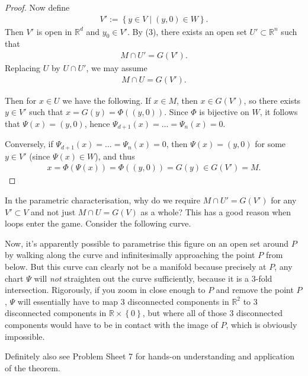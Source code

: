 \begin{proof}
	Now define
	\begin{align*}
		V' := \left\{ y \in V \mid (y,0) \in W \right\}.
	\end{align*}
	Then $V'$ is open in $\mathbb{R}^{d}$ and $y_{0} \in V'$. By (3), there exists an open set $U' \subset \mathbb{R}^{n}$ such that
	\begin{align*}
		M \cap U' = G(V').
	\end{align*}
	Replacing $U$ by $U \cap U'$, we may assume
	\begin{align*}
		M \cap U = G(V').
	\end{align*}

	Then for $x \in U$ we have the following. If $x \in M$, then $x \in G(V')$, so there exists $y \in V'$ such that $x = G(y) = \Phi((y,0))$. Since $\Phi$ is bijective on $W$, it follows that $\Psi(x) = (y,0)$, hence $\Psi_{d+1}(x) = \dots = \Psi_{n}(x) = 0$.

	Conversely, if $\Psi_{d+1}(x) = \dots = \Psi_{n}(x) = 0$, then $\Psi(x) = (y,0)$ for some $y \in V'$ (since $\Psi(x) \in W$), and thus
	\begin{align*}
		x = \Phi(\Psi(x)) = \Phi((y,0)) = G(y) \in G(V') = M.
	\end{align*}
\end{proof}


\begin{remark}
	In the parametric characterisation, why do we require $M \cap U' = G(V')$ for any $V' \subset V$ and not just $M \cap U = G(V)$ as a whole? This has a good reason when loops enter the game. Consider the following curve.
	\begin{center}
		\centering
		\def\svgwidth{0.3\linewidth}
		
	\end{center}
	Now, it's apparently possible to parametrise this figure on an open set around $P$ by walking along the curve and infinitesimally approaching the point $P$ from below. But this curve can clearly not be a manifold because precisely at $P$, any chart $\Psi$ will \textit{not} straighten out the curve sufficiently, because it is a $3$-fold intersection. Rigorously, if you zoom in close enough to $P$ and remove the point $P$, $\Psi$ will essentially have to map $3$ disconnected components in $\mathbb{R}^{2}$ to $3$ disconnected components in $\mathbb{R} \times \left\{ 0 \right\}$, but where all of those $3$ disconnected components would have to be in contact with the image of $P$, which is obviously impossible.

	Definitely also see Problem Sheet 7 for hands-on understanding and application of the theorem.
\end{remark}

